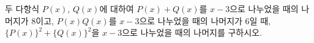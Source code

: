 두 다항식 $P(x)$, $Q(x)$에 대하여 $P(x)+Q(x)$를 $x-3$으로 나누었을 때의 나머지가 $8$이고, $P(x)Q(x)$를 $x-3$으로 나누었을 때의 나머지가 $6$일 때, $\{P(x)\}^2+\{Q(x)\}^2$을 $x-3$으로 나누었을 때의 나머지를 구하시오.
